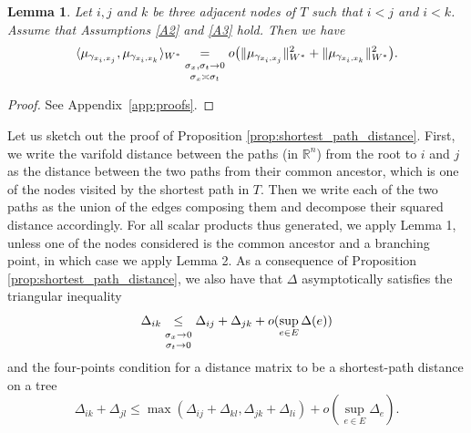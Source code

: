 \documentclass[pdflatex,sn-mathphys-num]{sn-jnl}%
\theoremstyle{thmstyleone}%
\newtheorem{lemma}{Lemma}
\theoremstyle{thmstyletwo}%
\theoremstyle{thmstylethree}%
\newcommand{\bR}{\mathbb R}
\begin{document}
\begin{lemma}\label{lemma:2}
    Let $i, j$ and $k$ be three adjacent nodes of $T$ such that $i < j$ and $i < k$. Assume that Assumptions \ref{A2} and \ref{A3} hold. Then we have
\begin{equation}
    \label{L2}
    \langle \mu_{\gamma_{x_i, x_j}}, \mu_{\gamma_{x_i, x_k}}\rangle_{W^\ast} \underset{\substack{\vspace{.05cm} \\ \sigma_x, \sigma_t \to 0 \vspace{.1cm} \\ \sigma_x \asymp \sigma_t}}{=} o\big(\|\mu_{\gamma_{x_i, x_j}}\|_{W^\ast}^2 + \|\mu_{\gamma_{x_i, x_k}}\|_{W^\ast}^2\big).
\end{equation}
\end{lemma}
\begin{proof}
    See Appendix~\ref{app:proofs}.
\end{proof}

Let us sketch out the proof of Proposition \ref{prop:shortest_path_distance}. First, we write the varifold distance between the paths (in $\bR^n$) from the root to $i$ and $j$ as the distance between the two paths from their common ancestor, which is one of the nodes visited by the shortest path in $T$. Then we write each of the two paths as the union of the edges composing them and decompose their squared distance accordingly. For all scalar products thus generated, we apply Lemma 1, unless one of the nodes considered is the common ancestor and a branching point, in which case we apply Lemma 2. 
\medbreak
As a consequence of Proposition \ref{prop:shortest_path_distance}, we also have that $\Delta$ asymptotically satisfies the triangular inequality
\begin{equation}
\Delta_{ik} \underset{\substack{\vspace{.05cm} \\ \sigma_x \to 0 \vspace{.05cm} \\ \sigma_t \to 0}}{\leq} \Delta_{ij} + \Delta_{jk} + o(\sup_{e \in E}\Delta(e))
\end{equation}
and the four-points condition for a distance matrix to be a shortest-path distance on a tree~\cite{pereira_note_1969}
\begin{equation}
\Delta_{ik} + \Delta_{jl} \leq \max(\Delta_{ij} + \Delta_{kl}, \Delta_{jk} +  \Delta_{li}) + o(\sup_{e \in E}\Delta_e).
\end{equation}
\end{document}
